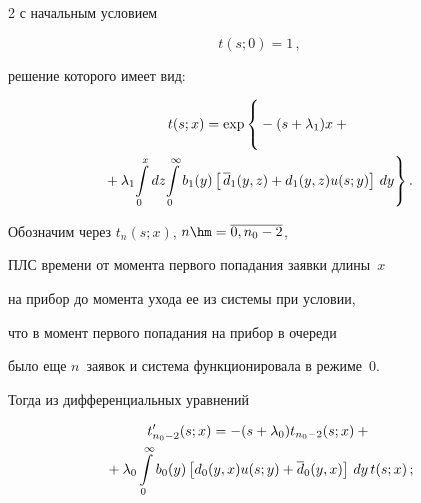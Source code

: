 \begin{multicols}{2}
с начальным условием


$$


t(s;0)= 1 \,,


$$


решение которого имеет вид:


\begin{multline*}


t(s;x) = \exp\left\{ \vphantom{\int\limits_0^\infty}


-(s + \lambda_1) x +{}\right.\\


\!\!\left.{}+ \lambda_1 \!\int\limits_0^x\,\! dz\!


\int\limits_0^\infty b_1(y) \left[\,\d_1(y,z) +  d_1(y,z) u(s;y)\right] \, dy


\right\}.


\end{multline*}





Обозначим через $t_n(s;x)$, $n\hm=\overline{0,n_0-2}$,


ПЛС времени от момента первого попадания заявки длины~$x$


на прибор до момента ухода ее из системы при условии,


что в момент первого попадания на прибор в очереди


было еще $n$~заявок и система функционировала в режиме~0.


Тогда из дифференциальных уравнений




\begin{multline*}


t'_{n_0-2}(s;x) = - (s + \lambda_0) t_{n_0-2}(s;x) +{}\\


{}+


\lambda_0 \int\limits_0^\infty b_0(y) \left[d_0(y,x) u(s;y) + \d_0(y,x)\right] \, dy\, t(s;x)\,;


\end{multline*}







\vspace*{-12pt}





\noindent


\begin{multline*}



\end{multline*}
\end{multicols}
